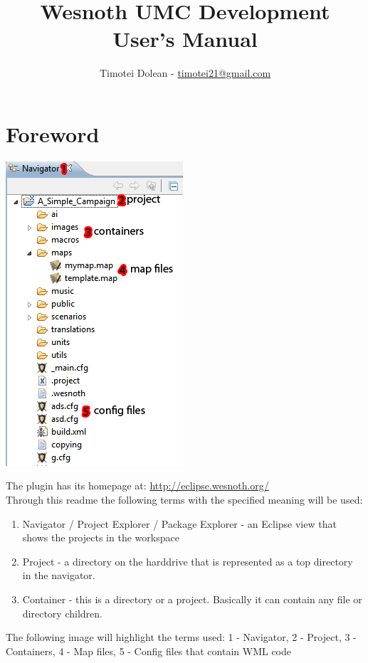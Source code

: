 \documentclass[10pt]{article}
\title{Wesnoth UMC Development \\ User's Manual}
\author{Timotei Dolean - \href{mailto:timotei21@gmail.com}{timotei21@gmail.com}}
\begin{document}
\maketitle

\tableofcontents
\setcounter{tocdepth}{3}
\newpage

\newcommand{\icnt}{ \stepcounter{cnt} \thecnt }

\section{Foreword}
\begin{multicols}{2}
  \begin{center}
    \includegraphics[scale=0.6]{definitions.png}
  \end{center}
The plugin has its homepage at: \href{http://eclipse.wesnoth.org/}{http://eclipse.wesnoth.org/} \\

Through this readme the following terms with the specified meaning will be used:
\begin{enumerate}
\item Navigator / Project Explorer / Package Explorer - an Eclipse view that shows the projects in the workspace
\item Project - a directory on the harddrive that is represented as a top directory in the navigator.
\item Container - this is a directory or a project. Basically it can contain any file or directory children.
\end{enumerate}

The following image will highlight the terms used: 1 - Navigator, 2 - Project, 3 - Containers, 4 - Map files, 5 - Config files that contain WML code
\end{multicols}
\end{document}
